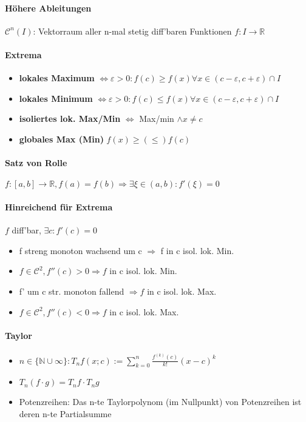 \documentclass[paper=a3,paper=landscape, fontsize=9pt, DIV=30]{scrartcl}
\newcommand{\real}{{\mathbb{R}}}
\newcommand{\nat}{\mathbb{N}}
\begin{document}
\begin{multicols*}{4}
  \paragraph{Höhere Ableitungen}
  $\mathscr{C}^n(I)$: Vektorraum aller n-mal stetig diff'baren Funktionen $f: I \rightarrow \real$

  \paragraph{Extrema}
  \begin{itemize}
  \item \textbf{lokales Maximum} $\Leftrightarrow \varepsilon > 0: f(c) \geq f(x) \forall x \in (c-\varepsilon,c+\varepsilon)\cap I$
  \item \textbf{lokales Minimum} $\Leftrightarrow \varepsilon > 0: f(c) \leq f(x) \forall x \in (c-\varepsilon,c+\varepsilon)\cap I$
  \item \textbf{isoliertes lok. Max/Min} $\Leftrightarrow$ Max/min $\wedge x \neq c$
  \item \textbf{globales Max (Min)} $f(x) \geq (\leq) f(c)$
  \end{itemize}

  \paragraph{Satz von Rolle}
  $f: [a,b] \rightarrow \real, f(a)=f(b) \Rightarrow \exists \xi \in (a,b): f'(\xi)=0$

  \paragraph{Hinreichend für Extrema}
  $f$ diff'bar, $\exists c: f'(c)=0$
  \begin{itemize}
  \item f streng monoton wachsend um c $\Rightarrow$ f in c isol. lok. Min.
  \item $f \in \mathscr{C}^2, f''(c)>0 \Rightarrow f$ in c isol. lok. Min.
  \item f' um c str. monoton fallend $\Rightarrow f$ in c isol. lok. Max.
  \item $f \in \mathscr{C}^2, f''(c)<0 \Rightarrow f$ in c isol. lok. Max.
  \end{itemize}


  \paragraph{Taylor}
  \begin{itemize}
  	\item $ n \in \{\nat \cup \infty\}: T_nf(x;c):= \sum_{k=0}^{n}\frac{f^{(k)}(c)}{k!}(x-c)^k$
  	\item $T_n(f \cdot g)=T_nf \cdot T_ng$
  	\item Potenzreihen: Das n-te Taylorpolynom (im Nullpunkt) von Potenzreihen ist deren n-te Partialsumme
  \end{itemize}


\end{multicols*}
\end{document}
